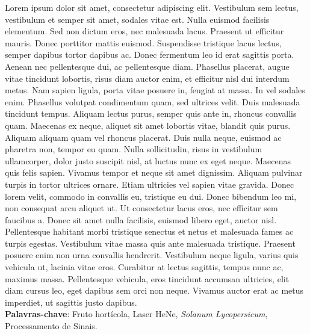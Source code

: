 \setlength{\absparsep}{18pt} %
\begin{resumo}
 

Lorem ipsum dolor sit amet, consectetur adipiscing elit. Vestibulum sem lectus, vestibulum et semper sit amet, sodales vitae est. Nulla euismod facilisis elementum. Sed non dictum eros, nec malesuada lacus. Praesent ut efficitur mauris. Donec porttitor mattis euismod. Suspendisse tristique lacus lectus, semper dapibus tortor dapibus ac. Donec fermentum leo id erat sagittis porta. Aenean nec pellentesque dui, ac pellentesque diam. Phasellus placerat, augue vitae tincidunt lobortis, risus diam auctor enim, et efficitur nisl dui interdum metus. Nam sapien ligula, porta vitae posuere in, feugiat at massa. In vel sodales enim. Phasellus volutpat condimentum quam, sed ultrices velit. Duis malesuada tincidunt tempus. Aliquam lectus purus, semper quis ante in, rhoncus convallis quam. Maecenas ex neque, aliquet sit amet lobortis vitae, blandit quis purus. Aliquam aliquam quam vel rhoncus placerat. Duis nulla neque, euismod ac pharetra non, tempor eu quam. Nulla sollicitudin, risus in vestibulum ullamcorper, dolor justo suscipit nisl, at luctus nunc ex eget neque. Maecenas quis felis sapien. Vivamus tempor et neque sit amet dignissim. Aliquam pulvinar turpis in tortor ultrices ornare. Etiam ultricies vel sapien vitae gravida. Donec lorem velit, commodo in convallis eu, tristique eu dui. Donec bibendum leo mi, non consequat arcu aliquet ut. Ut consectetur lacus eros, nec efficitur sem faucibus a. Donec sit amet nulla facilisis, euismod libero eget, auctor nisl. Pellentesque habitant morbi tristique senectus et netus et malesuada fames ac turpis egestas. Vestibulum vitae massa quis ante malesuada tristique. Praesent posuere enim non urna convallis hendrerit. Vestibulum neque ligula, varius quis vehicula ut, lacinia vitae eros. Curabitur at lectus sagittis, tempus nunc ac, maximus massa. Pellentesque vehicula, eros tincidunt accumsan ultricies, elit diam cursus leo, eget dapibus sem orci non neque. Vivamus auctor erat ac metus imperdiet, ut sagittis justo dapibus.
 \\

 \textbf{Palavras-chave}: Fruto hortícola, Laser HeNe, \emph{Solanum Lycopersicum}, Processamento de Sinais.
\end{resumo}